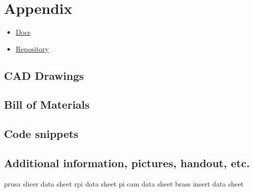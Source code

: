 \chapter{Appendix}
\label{ch:appendix}

\begin{itemize}
    \item \href{https://haziqsabtu.github.io/SpeedCameraPi/}{Docs}
    \item \href{https://github.com/HaziqSabtu/SpeedCameraPi}{Repository}
\end{itemize}

\section{CAD Drawings}
\section{Bill of Materials}

\section{Code snippets}
\section{Additional information, pictures, handout, etc.}
prusa slicer data sheet
rpi data sheet
pi cam data sheet
brass insert data sheet
